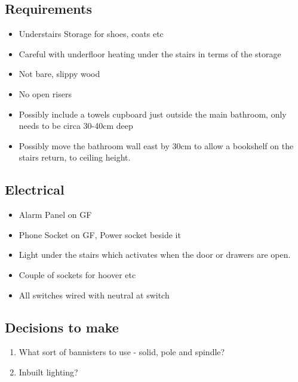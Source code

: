\subsection{Requirements}
\begin{itemize}
\item Understairs Storage for shoes, coats etc
\item Careful with underfloor heating under the stairs in terms of the storage
\item Not bare, slippy wood
\item No open risers
\item Possibly include a towels cupboard just outside the main bathroom, only needs to be circa 30-40cm deep
\item Possibly move the bathroom wall east by 30cm to allow a bookshelf on the stairs return, to ceiling height.
\end{itemize}

\subsection{Electrical}
\begin{itemize}
\item Alarm Panel on GF
\item Phone Socket on GF, Power socket beside it
\item Light under the stairs which activates when the door or drawers are open.
\item Couple of sockets for hoover etc
\item All switches wired with neutral at switch
\end{itemize}

\subsection{Decisions to make}
\begin{enumerate}
\item What sort of bannisters to use - solid, pole and spindle?
\item Inbuilt lighting? 
\end{enumerate}
